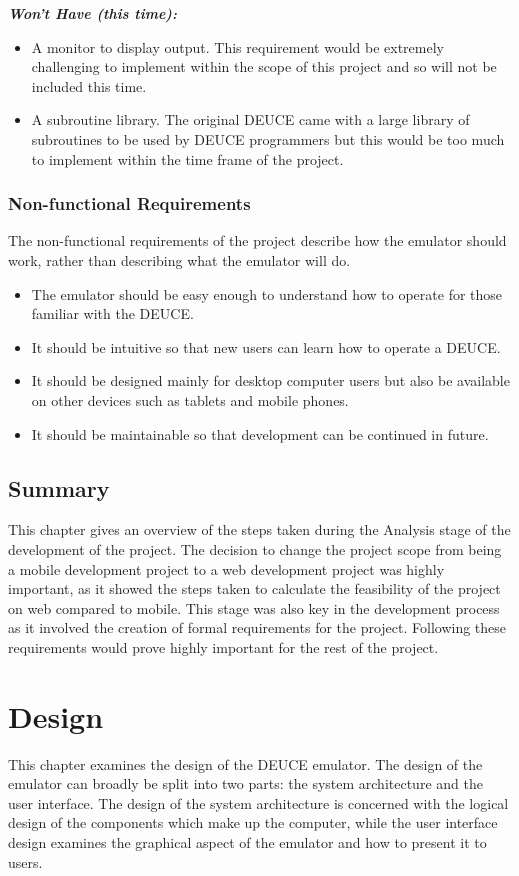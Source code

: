 \documentclass{l4proj}
\begin{document}
\textbf{\textit{Won't Have (this time):}}
\begin{itemize}
	\item A monitor to display output. This requirement would be extremely challenging to implement within the scope of this project and so will not be included this time.
	\item A subroutine library. The original DEUCE came with a large library of subroutines to be used by DEUCE programmers but this would be too much to implement within the time frame of the project.
\end{itemize}
\subsection{Non-functional Requirements}
The non-functional requirements of the project describe how the emulator should work, rather than describing what the emulator will do. 
\begin{itemize}
	\item The emulator should be easy enough to understand how to operate for those familiar with the DEUCE.
	\item It should be intuitive so that new users can learn how to operate a DEUCE.
	\item It should be designed mainly for desktop computer users but also be available on other devices such as tablets and mobile phones.
	\item It should be maintainable so that development can be continued in future.
\end{itemize}

\section{Summary}
This chapter gives an overview of the steps taken during the Analysis stage of the development of the project. The decision to change the project scope from being a mobile development project to a web development project was highly important, as it showed the steps taken to calculate the feasibility of the project on web compared to mobile. This stage was also key in the development process as it involved the creation of formal requirements for the project. Following these requirements would prove highly important for the rest of the project.

\chapter{Design}
This chapter examines the design of the DEUCE emulator. The design of the emulator can broadly be split into two parts: the system architecture and the user interface. The design of the system architecture is concerned with the logical design of the components which make up the computer, while the user interface design examines the graphical aspect of the emulator and how to present it to users.
\end{document}
